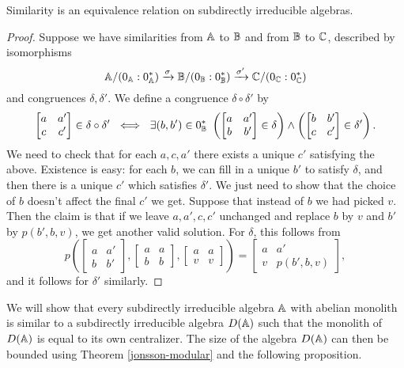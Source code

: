 \begin{appendices}
\begin{cor} Similarity is an equivalence relation on subdirectly irreducible algebras.
\end{cor}
\begin{proof} Suppose we have similarities from $\mathbb{A}$ to $\mathbb{B}$ and from $\mathbb{B}$ to $\mathbb{C}$, described by isomorphisms
\[
\mathbb{A}/(0_{\mathbb{A}}:0_{\mathbb{A}}^*) \xrightarrow{\sigma} \mathbb{B}/(0_{\mathbb{B}}:0_{\mathbb{B}}^*) \xrightarrow{\sigma'} \mathbb{C}/(0_{\mathbb{C}}:0_{\mathbb{C}}^*)
\]
and congruences $\delta, \delta'$. We define a congruence $\delta \circ \delta'$ by
\[
\begin{bmatrix} a & a'\\ c & c'\end{bmatrix} \in \delta \circ \delta'\ \iff\ \exists (b,b') \in 0_{\mathbb{B}}^*\ \left(\begin{bmatrix} a & a'\\ b & b'\end{bmatrix} \in \delta\right) \wedge \left(\begin{bmatrix} b & b'\\ c & c'\end{bmatrix} \in \delta'\right).
\]
We need to check that for each $a,c,a'$ there exists a unique $c'$ satisfying the above. Existence is easy: for each $b$, we can fill in a unique $b'$ to satisfy $\delta$, and then there is a unique $c'$ which satisfies $\delta'$. We just need to show that the choice of $b$ doesn't affect the final $c'$ we get. Suppose that instead of $b$ we had picked $v$. Then the claim is that if we leave $a,a',c,c'$ unchanged and replace $b$ by $v$ and $b'$ by $p(b',b,v)$, we get another valid solution. For $\delta$, this follows from
\[
p\left(\begin{bmatrix} a & a'\\ b & b'\end{bmatrix}, \begin{bmatrix} a & a\\ b & b\end{bmatrix}, \begin{bmatrix} a & a\\ v & v\end{bmatrix}\right) = \begin{bmatrix} a & a'\\ v & p(b',b,v)\end{bmatrix},
\]
and it follows for $\delta'$ similarly.
\end{proof}

We will show that every subdirectly irreducible algebra $\mathbb{A}$ with abelian monolith is similar to a subdirectly irreducible algebra $D(\mathbb{A})$ such that the monolith of $D(\mathbb{A})$ is equal to its own centralizer. The size of the algebra $D(\mathbb{A})$ can then be bounded using Theorem \ref{jonsson-modular} and the following proposition.


\end{appendices}
